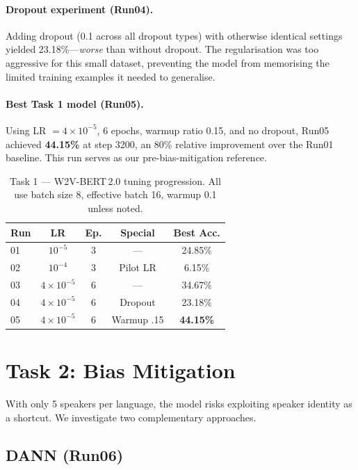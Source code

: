 \documentclass[11pt]{article}
\begin{document}
\paragraph{Dropout experiment (Run04).}
Adding dropout (0.1 across all dropout types) with otherwise identical settings yielded 23.18\%—\emph{worse} than without dropout.
The regularisation was too aggressive for this small dataset, preventing the model from memorising the limited training examples it needed to generalise.

\paragraph{Best Task 1 model (Run05).}
Using LR $= 4{\times}10^{-5}$, 6 epochs, warmup ratio 0.15, and no dropout, Run05 achieved \textbf{44.15\%} at step 3200, an 80\% relative improvement over the Run01 baseline.
This run serves as our pre-bias-mitigation reference.

\begin{table}[t]
\centering
\small
\begin{tabular}{lcccc}
\toprule
\textbf{Run} & \textbf{LR} & \textbf{Ep.} & \textbf{Special} & \textbf{Best Acc.} \\
\midrule
01 & $10^{-5}$ & 3 & —         & 24.85\% \\
02 & $10^{-4}$ & 3 & Pilot LR  &  6.15\% \\
03 & $4{\times}10^{-5}$ & 6 & —  & 34.67\% \\
04 & $4{\times}10^{-5}$ & 6 & Dropout   & 23.18\% \\
05 & $4{\times}10^{-5}$ & 6 & Warmup .15 & \textbf{44.15\%} \\
\bottomrule
\end{tabular}
\caption{Task 1 — W2V-BERT\,2.0 tuning progression. All use batch size 8, effective batch 16, warmup 0.1 unless noted.}
\label{tab:task1}
\end{table}

\section{Task 2: Bias Mitigation}
\label{sec:task2}

With only 5 speakers per language, the model risks exploiting speaker identity as a shortcut.
We investigate two complementary approaches.

\subsection{DANN (Run06)}
\end{document}
